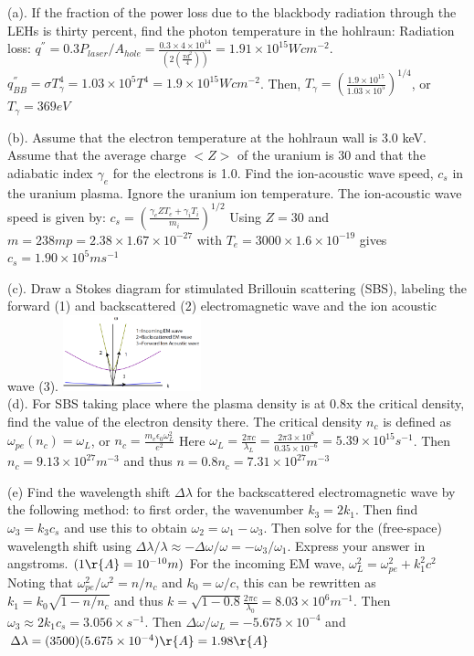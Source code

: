 \documentclass[10pt]{extarticle}
\begin{document}
\begin{multicols}{3}
(a). If the fraction of the power loss due to the blackbody radiation through the LEHs is thirty percent, find the photon temperature in the hohlraun: Radiation loss: $q^{''} = 0.3P_{laser} /A_{hole} = \frac{0.3\times4\times10^{14}}{(2(\frac{\pi d^{2}}{4	}))} = 1.91 \times 10^{15}Wcm^{-2}$. 
$q^{''}_{BB} = \sigma T_{\gamma}^{4} = 1.03 \times 10^{5}T^{4} = 1.9\times 10^{15} W cm^{-2}$.  Then, $T_{\gamma} =  (\frac{1.9\times 10^{15}}{1.03\times 10^{5}})^{1/4}$, or $T_{\gamma} = 369 eV$

(b). Assume that the electron temperature at the hohlraun wall is 3.0 keV.  Assume that the average charge $<Z>$ of the uranium is 30 and that the adiabatic index $\gamma_{e}$ for the electrons is 1.0.  Find the ion-acoustic wave speed, $c_{s}$ in the uranium plasma.  Ignore the uranium ion temperature.
The ion-acoustic wave speed is given by: 
$c_{s} = (\frac{\gamma_{e}ZT_{e} + \gamma_{i}T_{i}}{m_{i}})^{1/2}$
Using $Z=30$ and $m=238mp= 2.38 \times 1.67 \times 10^{-27}$ with $T_{e} = 3000 \times 1.6 \times 10^{-19}$ gives $c_{s} = 1.90\times 10^{5}ms^{-1}$

(c). Draw a Stokes diagram for stimulated Brillouin scattering (SBS), labeling the forward (1) and backscattered (2) electromagnetic wave and the ion acoustic wave (3).
\includegraphics[width=4cm]{images/SBS_MT2.png}\\

(d). For SBS taking place where the plasma density is at 0.8x the critical density, find the value of the electron density there.
The critical density $n_{c}$ is defined as $\omega_{pe}(n_{c}) = \omega_{L}$, or $n_{c} = \frac{m_{e}\epsilon_{0}\omega_{L}^{2}}{e^{2}}$
Here $\omega_{L} = \frac{2\pi c}{\lambda_{L}} = \frac{2\pi 3\times10^{8}}{0.35\times 10^{-6}} = 5.39\times 10^{15}s^{-1}$. Then $n_{c} = 9.13 \times 10^{27} m^{-3}$ and thus $n = 0.8n_{c} = 7.31\times 10^{27} m^{-3}$

(e) Find the wavelength shift $\Delta \lambda$ for the backscattered electromagnetic wave by the following method: to first order, the wavenumber $k_{3} = 2k_{1}$.  Then find $\omega_{3} = k_{3}c_{s}$ and use this to obtain $\omega_{2} = \omega_{1} - \omega_{3}$. Then solve for the (free-space) wavelength shift using $\Delta \lambda / \lambda \approx - \Delta \omega / \omega = -\omega_{3} / \omega_{1}$.  Express your answer in angstroms. $(1\r{A} = 10^{-10}m)$
For the incoming EM wave, $\omega_{L}^{2} = \omega_{pe}^{2} + k_{1}^{2}c^{2}$
Noting that $\omega_{pe}^{2}/\omega^{2} = n/n_{c	}$ and $k_{0} = \omega/c$, this can be rewritten as $k_{1} = k_{0}\sqrt{1-n/n_{c}}$ and thus $k = \sqrt{1-0.8} \frac{2\pi c}{\lambda_{0}} = 8.03 \times 10^{6} m^{-1}$.  Then $\omega_{3} \approx 2k_{1}c_{s} = 3.056\times s^{-1}$.  Then $\Delta\omega / \omega_{L} = -5.675\times 10^{-4}$ and $\Delta\lambda = (3500)(5.675\times 10^{-4}) \r{A} = 1.98 \r{A}$

\end{multicols}
 
\end{document}
